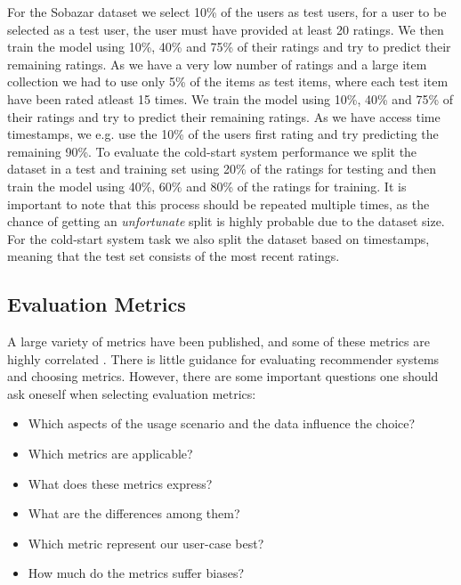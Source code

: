 For the Sobazar dataset we select 10\% of the users as test users, for a user to be
selected as a test user, the user must have provided at least 20 ratings. We then train
the model using 10\%, 40\% and 75\% of their ratings and try to predict their remaining ratings.
As we have a very low number of ratings and a large item collection we had to use
only 5\% of the items as test items, where each test item have been rated atleast 15 times.
We train the model using 10\%, 40\% and 75\% of their ratings and try to predict their remaining
ratings. As we have access time timestamps, we e.g. use the 10\% of the users first rating and try
predicting the remaining 90\%. To evaluate the cold-start system performance we split the dataset in a test
and training set using 20\% of the ratings for testing and then train the model
using 40\%, 60\% and 80\% of the ratings for training. It is important to note that
this process should be repeated multiple times, as the chance of getting an
\emph{unfortunate} split is highly probable due to the dataset size. For the cold-start
system task we also split the dataset based on timestamps, meaning that the test set consists
of the most recent ratings.



\subsection{Evaluation Metrics}



A large variety of metrics have been published, and some of these metrics are highly correlated \cite{Herlocker2004}.
There is little guidance for evaluating recommender systems and choosing metrics. However, there are
some important questions one should ask oneself when selecting evaluation metrics:

\begin{itemize}
	\item Which aspects of the usage scenario and the data influence the choice?
	\item Which metrics are applicable?
	\item What does these metrics express?
	\item What are the differences among them?
	\item Which metric represent our user-case best?
	\item How much do the metrics suffer biases?
\end{itemize}

